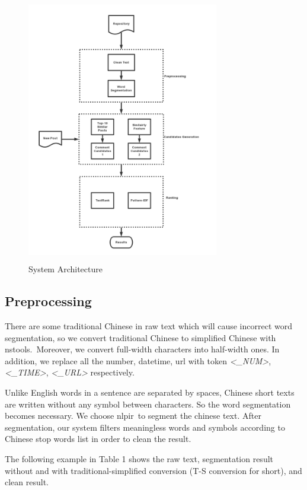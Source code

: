 \documentclass{sig-alternate}
\begin{document}
\begin{figure}
  \includegraphics[height=4.6in, width=3.3in]{stc-flow.png}
  \caption{System Architecture}
\end{figure}

\subsection{Preprocessing}
There are some traditional Chinese in raw text which will cause incorrect 
word segmentation, so we convert traditional Chinese to simplified Chinese with 
nstools\footnotemark.\ Moreover, we convert full-width characters into half-width
ones. In addition, we replace all the number, datetime, url with token \emph{<\_NUM>}, 
\emph{<\_TIME>}, \emph{<\_URL>} respectively.

Unlike English words in a sentence are separated by spaces, Chinese short texts 
are written without any symbol between characters. So the word segmentation 
becomes necessary. We choose nlpir\footnotemark\ to segment the chinese text. 
After segmentation, our system filters meaningless words and symbols according 
to Chinese stop words list in order to clean the result.

The following example in Table 1 shows the raw text, segmentation result 
without and with traditional-simplified conversion (T-S conversion for short), 
and clean result.
\end{document}
